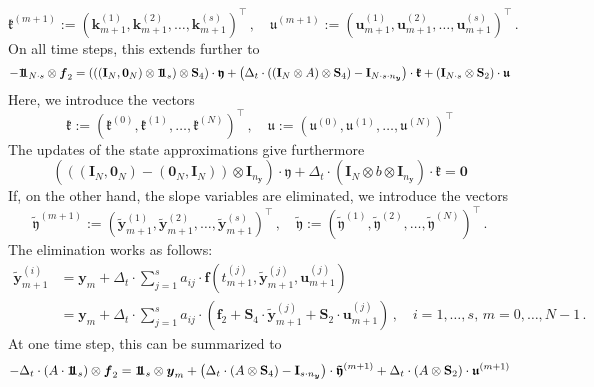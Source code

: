 \documentclass{article}
\newcommand{\defeq}{\mathrel{:=}}%
\newcommand{\tp}{\top}%
\newcommand{\kron}{\otimes}%
\newcommand{\vectorfont}[1]{\boldsymbol{#1}}%
\newcommand{\greekvectorfont}[1]{\boldsymbol{#1}}%
\newcommand{\matrixfont}[1]{\mathbf{#1}}%
\newcommand{\fvec}{\vectorfont{f}}
\newcommand{\kvec}{\vectorfont{k}}
\newcommand{\uvec}{\vectorfont{u}}
\newcommand{\yvec}{\vectorfont{y}}
\newcommand{\tildeyvec}{\vectorfont{\tilde{y}}}
\newcommand{\kfrakvec}{\vectorfont{\mathfrak{k}}}
\newcommand{\ufrakvec}{\vectorfont{\mathfrak{u}}}
\newcommand{\yfrakvec}{\vectorfont{\mathfrak{y}}}
\newcommand{\tildeyfrakvec}{\vectorfont{\tilde{\mathfrak{y}}}}
\newcommand{\nullvec}{\greekvectorfont{0}}
\newcommand{\einsvec}{\vectorfont{1}\negthinspace\negthinspace\vectorfont{1}} %
\newcommand{\Imat}{\matrixfont{I}}%
\newcommand{\Smat}{\matrixfont{S}}
\begin{document}
\begin{equation*}
\kfrakvec^{(m+1)} \defeq (\kvec_{m+1}^{(1)}, \kvec_{m+1}^{(2)}, \ldots, \kvec_{m+1}^{(s)})^{\tp}\,,
\quad
\ufrakvec^{(m+1)} \defeq (\uvec_{m+1}^{(1)}, \uvec_{m+1}^{(2)}, \ldots, \uvec_{m+1}^{(s)})^{\tp}\,.
\end{equation*}
On all time steps, this extends further to
\[
-\einsvec_{N\cdot s}\kron \fvec_2
 = \left(((\Imat_N ,\nullvec_N)\kron \einsvec_s) \kron \Smat_4 \right) \cdot \yfrakvec
  + \left( \Delta_t \cdot ((\Imat_N \kron A)\kron \Smat_4) - \Imat_{N\cdot s \cdot n_{\yvec}}\right)\cdot \kfrakvec  + (\Imat_{N\cdot s}\kron \Smat_2) \cdot \ufrakvec
\]
Here, we introduce the vectors
\[
\kfrakvec \defeq (\kfrakvec^{(0)}, \kfrakvec^{(1)}, \ldots , \kfrakvec^{(N)})^{\tp}\,,\quad
\ufrakvec \defeq (\ufrakvec^{(0)}, \ufrakvec^{(1)}, \ldots , \ufrakvec^{(N)})^{\tp}
\]
The updates of the state approximations give furthermore 
\[
\left(
((\Imat_N, \nullvec_N) - (\nullvec_N, \Imat_N)) \kron \Imat_{n_{\yvec}}
\right) \cdot \yfrakvec 
+ \Delta_t \cdot  (\Imat_N \kron b \kron \Imat_{n_{\yvec}}) \cdot \kfrakvec = \nullvec
\]
If, on the other hand, the slope variables are eliminated, we introduce the vectors
\[
\tildeyfrakvec^{(m+1)} \defeq (\tildeyvec_{m+1}^{(1)}, \tildeyvec_{m+1}^{(2)}, \ldots, \tildeyvec_{m+1}^{(s)})^{\tp}\,,
\quad
\tildeyfrakvec \defeq (\tildeyfrakvec^{(1)}, \tildeyfrakvec^{(2)}, \ldots, \tildeyfrakvec^{(N)})^{\tp}\,.
\]
The elimination works as follows:
\begin{align*}
\tildeyvec_{m+1}^{(i)} &= \yvec_m + \Delta_t \cdot \sum_{j=1}^s a_{ij} \cdot \fvec(t_{m+1}^{(j)}, \tildeyvec_{m+1}^{(j)}, \uvec_{m+1}^{(j)})
\\
 &= \yvec_m + \Delta_t \cdot \sum_{j=1}^s a_{ij} \cdot \left( \fvec_2  + \Smat_4 \cdot \tildeyvec_{m+1}^{(j)} + \Smat_2 \cdot \uvec_{m+1}^{(j)}\right)\,,\quad i = 1 ,\ldots,s,\, m = 0,\ldots, N-1\,.
\end{align*}
At one time step, this can be summarized to
\[
-\Delta_t \cdot (A\cdot \einsvec_s) \kron \fvec_2 
 = \einsvec_s \kron \yvec_m + \left( \Delta_t \cdot (A \kron \Smat_4) - \Imat_{s \cdot n_{\yvec}} \right)\cdot \tildeyfrakvec^{(m+1)} + \Delta_t \cdot (A \kron \Smat_2) \cdot \ufrakvec^{(m+1)}
\]
\end{document}
